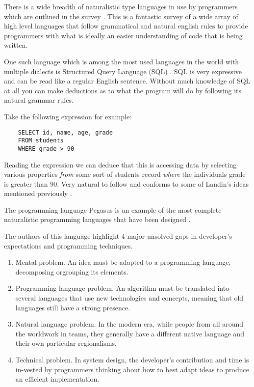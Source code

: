 \documentclass[12pt]{article}
\begin{document}
There is a wide breadth of naturalistic type languages in use by programmers which are outlined in the survey
\parencite{Pulido-Prieto}. This is a fantastic survey of a wide array of high level
languages that follow grammatical and natural english rules to provide programmers with what is
ideally an easier understanding of code that is being written.

One such language which is among the most used languages in the world with multiple
dialects is Structured Query Language (SQL) \parencite{stackoverflow}. SQL is very expressive
and can be read like a regular English sentence. Without much knowledge of SQL at all you can make
deductions as to what the program will do by following its natural grammar rules.

Take the following expression for example:

\begin{verbatim}
    SELECT id, name, age, grade
    FROM students
    WHERE grade > 90
\end{verbatim}

Reading the expression we can deduce that this is accessing data by selecting various properties
\emph{from} some sort of students record \emph{where} the individuals grade is greater than 90.
Very natural to follow and conforms to some of Landin's ideas mentioned previously \parencite{Landin:1966:NPL:365230.365257}.

The programming language Pegasus is an example of the most complete naturalistic programming languages that
have been designed \parencite{Knoll:2006:PFS:1176617.1176628}.

The authors of this language highlight 4 major unsolved gaps in developer's expectations and programming techniques.

\begin{enumerate}
\item{Mental problem. An idea must be adapted to a programming language, decomposing orgrouping its elements.}

\item{Programming language problem. An algorithm must be translated into several languages that use new technologies and concepts, meaning that old languages still have a strong presence.}

\item{Natural language problem. In the modern era, while people from all around the worldwork in teams, they generally have a different native language and their own particular regionalisms.}

\item{Technical problem. In system design, the developer’s contribution and time is in-vested by programmers thinking about how to best adapt ideas to produce an efficient implementation.}
\end{enumerate}
\end{document}
